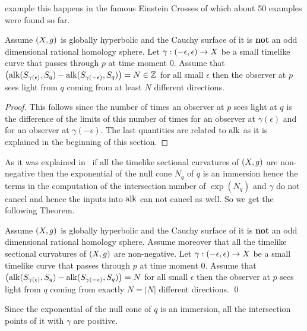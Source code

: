\documentclass[12pt,reqno,a4paper]{amsart}
\begin{document}
        example this happens in the famous Einstein Crosses of which about
        50 examples were found so far.
        \begin{thm}\label{theorem1}
            Assume $(\ss, g)$ is globally hyperbolic and the Cauchy surface of
            it is {\bf not} an odd dimensional rational homology sphere. Let
            $\gamma:(-\epsilon, \epsilon)\to \ss$ be a small timelike curve
            that passes through $p$ at time moment $0.$ Assume that
            $\bigl(\alk(S_{\gamma(\epsilon)},S_q)-\alk(S_{\gamma(-\epsilon)},S_q)\bigr)=N\in\mathbb{Z}$
            for all small $\epsilon$ then the observer at $p$ sees light from
            $q$ coming from at least $N$ different directions.
        \end{thm}
        \begin{proof}
            This follows since the number of times an observer at $p$ sees
            light at $q$ is the difference of the limits of this number of
            times for an observer at $\gamma(\epsilon)$ and for an observer
            at $\gamma(-\epsilon)$. The last quantities are related to $\alk$
            as it is explained in the beginning of this section.
        \end{proof}
        As it was explained in~\cite{ChernovRudyak} if all the timelike
        sectional curvatures of $(\ss, g)$ are non-negative then the
        exponential of the null cone $N_q$ of $q$ is an immersion hence the
        terms in the computation of the intersection number of $\exp(N_q)$ and
        $\gamma$ do not cancel and hence the inputs into $\alk$ can not cancel
        as well. So we get the following Theorem.
        \begin{thm}
            \label{theorem2}%
            Assume $(\ss, g)$ is globally hyperbolic and the Cauchy
            surface of it is {\bf not} an odd dimensional rational homology
            sphere. Assume moreover that all the timelike sectional curvatures
            of $(\ss,g)$ are non-negative. Let
            $\gamma:(-\epsilon, \epsilon)\to \ss$ be a small timelike curve
            that passes through $p$ at time moment $0.$ Assume that
            $\bigl ( \alk(S_{\gamma(\epsilon)}, S_q)-\alk(S_{\gamma(-\epsilon)}, S_q)\bigr)=N$
            for all small $\epsilon$ then the observer at $p$ sees light
            from $q$ coming from exactly $N=|N|$ different directions.
            \qed
        \end{thm}
        \begin{rem}
            Since the exponential of the null cone of $q$ is an immersion,
            all the intersection points of it with $\gamma$ are positive.
        \end{rem}
\end{document}
